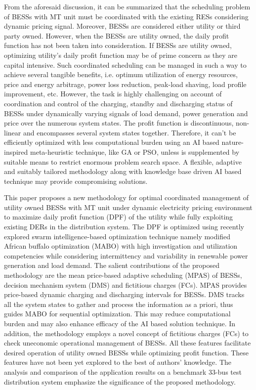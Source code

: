 \documentclass[journal]{IEEEtran}
\begin{document}
\par From the aforesaid discussion, it can be summarized that the scheduling problem of BESSs with MT unit must be coordinated with the existing RESs considering dynamic pricing signal. Moreover, BESSs are considered either utility or third party owned. However, when the BESSs are utility owned, the daily profit function has not been taken into consideration. If BESSs are utility owned, optimizing utility’s daily profit function may be of prime concern as they are capital intensive.  Such coordinated scheduling can be managed in such a way to achieve several tangible benefits, i.e. optimum utilization of energy resources, price and energy arbitrage, power loss reduction, peak-load shaving, load profile improvement, etc. However, the task is highly challenging on account of coordination and control of the charging, standby and discharging status of BESSs under dynamically varying signals of load demand, power generation and price over the numerous system states. The profit function is discontinuous, non-linear and encompasses several system states together. Therefore, it can’t be efficiently optimized with less computational burden using an AI based nature-inspired meta-heuristic technique, like GA or PSO, unless is supplemented by suitable means to restrict enormous problem search space. A flexible, adaptive and suitably tailored methodology along with knowledge base driven AI based technique may provide compromising solutions. 
%	
\par This paper proposes a new methodology for optimal coordinated management of utility owned BESSs with MT unit under dynamic electricity pricing environment to maximize daily profit function (DPF) of the utility while fully exploiting existing DERs in the distribution system. The DPF is optimized using recently explored swarm intelligence-based optimization technique namely modified African buffalo optimization (MABO) with high investigation and utilization competencies while considering intermittency and variability in renewable power generation and load demand. The salient contributions of the proposed methodology are the mean price-based adaptive scheduling (MPAS) of BESSs, decision mechanism system (DMS) and fictitious charges (FCs). MPAS provides price-based dynamic charging and discharging intervals for BESSs. DMS tracks all the system states to gather and process the information as a priori, thus guides MABO for sequential optimization. This may reduce computational burden and may also enhance efficacy of the AI based solution technique. In addition, the methodology employs a novel concept of fictitious charges (FCs) to check uneconomic operational management of BESSs. All these features facilitate desired operation of utility owned BESSs while optimizing profit function. These features have not been yet explored to the best of authors' knowledge. The analysis and comparison of the application results on a benchmark 33-bus test distribution system emphasize the significance of the proposed methodology. 
\end{document}
